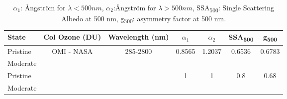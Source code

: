 \begin{table}[H]
    \centering
    \begin{tabular}{lcccccc}
        \hline
        State     & Col Ozone (DU)              & Wavelength (nm)           & $\alpha_1$ & $\alpha_2$ & SSA\textsubscript{500}                      & g\textsubscript{500} \\ \hline
        Pristine  & \multirow{4}{*}{OMI - NASA} & \multirow{4}{*}{285-2800} & \multirow{2}{*}{0.8565}    & \multirow{2}{*}{1.2037}    & \multirow{2}{*}{0.6536} & \multirow{2}{*}{0.6783}  \\
        Moderate  &                             &                           &                            &                            &                             &                          \\
        Pristine  &                             &                           & \multirow{2}{*}{1}         & \multirow{2}{*}{1}         & \multirow{2}{*}{0.8}        & \multirow{2}{*}{0.68}    \\
        Moderate  &                             &                           &                            &                            &                             &                          \\ \hline
    \end{tabular}
    \caption{$\alpha_1$: \AA ngstr\"om for $\lambda<500 nm$, $\alpha_2$:\AA ngstr\"om for $\lambda>500 nm$, SSA\textsubscript{500}: Single Scattering Albedo at 500 nm, g\textsubscript{500}: asymmetry factor at 500 nm.}
    \label{table:parameters}
\end{table}